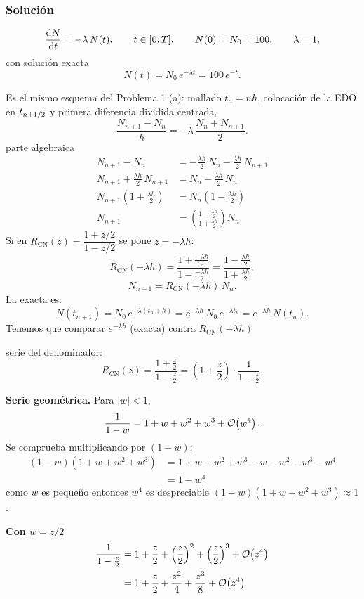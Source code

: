 \subsubsection*{Solución}
\[
\frac{\mathrm{d} N}{\mathrm{d} t} = -\lambda\,N(t), \qquad t \in [0, T], \qquad N(0) = N_0 = 100, \qquad \lambda = 1,
\]
con solución exacta
\[
N(t) = N_0\, e^{-\lambda t} = 100\, e^{-t}.
\]



Es el mismo esquema del Problema 1 (a): mallado $t_n = n h$, colocación de la EDO en $t_{n+1/2}$ y primera
diferencia dividida centrada,
\[
\frac{N_{n+1} - N_n}{h} = -\lambda\,\frac{N_n + N_{n+1}}{2}.
\]
parte algebraica
\begin{align*}
	N_{n+1} - N_n &= -\frac{\lambda h}{2}\,N_n - \frac{\lambda h}{2}\,N_{n+1}\\
	N_{n+1} + \frac{\lambda h}{2}\,N_{n+1} &= N_n - \frac{\lambda h}{2}\,N_n\\
	N_{n+1}\left(1 + \frac{\lambda h}{2}\right) &= N_n\left(1 - \frac{\lambda h}{2}\right)\\
	N_{n+1} &= \left(\frac{1 - \frac{\lambda h}{2}}{1 + \frac{\lambda h}{2}}\right) N_n
\end{align*}
Si en $R_{\mathrm{CN}}(z) = \dfrac{1 + z/2}{1 - z/2}$ se pone $z = -\lambda h$:
\[
R_{\mathrm{CN}}(-\lambda h) = \frac{1 + \frac{-\lambda h}{2}}{1 - \frac{-\lambda h}{2}}
= \frac{1 - \frac{\lambda h}{2}}{1 + \frac{\lambda h}{2}},
\]
\[
N_{n+1} = R_{\mathrm{CN}}(-\lambda h)\,N_n .
\]
La exacta es:
\[
N(t_{n+1}) = N_0\, e^{-\lambda (t_n + h)} = e^{-\lambda h}\, N_0\, e^{-\lambda t_n} = e^{-\lambda h}\,N(t_n).
\]
Tenemos que comparar $e^{-\lambda h}$ (exacta) contra $R_{\mathrm{CN}}(-\lambda h)$ 


serie del denominador:
\[
R_{\mathrm{CN}}(z) = \frac{1 + \frac{z}{2}}{1 - \frac{z}{2}} = \left(1 + \frac{z}{2}\right)\cdot\frac{1}{1 - \frac{z}{2}} .
\]

\textbf{Serie geométrica.} Para $|w| < 1$,
\[
\frac{1}{1 - w} = 1 + w + w^2 + w^3 + \mathcal{O}\!\left(w^4\right).
\]
Se comprueba multiplicando por $(1 - w)$:
\begin{align*}
	(1 - w)\left(1 + w + w^2 + w^3\right) &= 1 + w + w^2 + w^3 - w - w^2 - w^3 - w^4\\
	&= 1 - w^4
\end{align*}
como $w$ es pequeño entonces $w^4$ es despreciable $(1 - w)(1 + w + w^2 + w^3) \approx 1$.

\textbf{Con $w = z/2$}
\begin{align*}
	\frac{1}{1 - \frac{z}{2}} &= 1 + \frac{z}{2} + \left(\frac{z}{2}\right)^2 + \left(\frac{z}{2}\right)^3 + \mathcal{O}\!\left(z^4\right)\\
	&= 1 + \frac{z}{2} + \frac{z^2}{4} + \frac{z^3}{8} + \mathcal{O}\!\left(z^4\right)
\end{align*}

